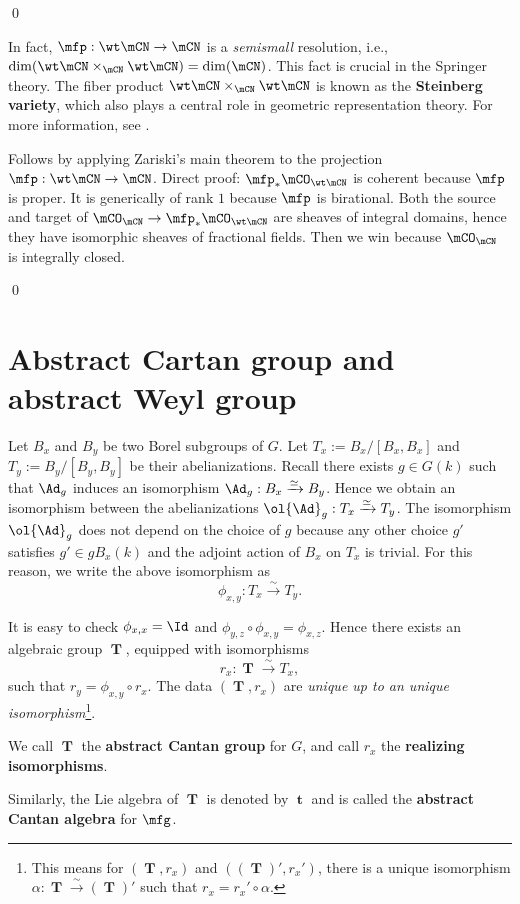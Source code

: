 	\qed

	\begin{rem}
		In fact, $\mfp:\wt\mCN \to \mCN$ is a \emph{semismall} resolution, i.e., $\dim(\wt\mCN\mt_\mCN\wt\mCN) = \dim(\mCN)$. This fact is crucial in the Springer theory. The fiber product $\wt\mCN\mt_\mCN\wt\mCN$ is known as the \textbf{Steinberg variety}, which also plays a central role in geometric representation theory. For more information, see \cite{CG}.
	\end{rem}


		Follows by applying Zariski's main theorem to the projection $\mfp: \wt\mCN \to \mCN$. Direct proof: $\mfp_* \mCO_{\wt\mCN}$ is coherent because $\mfp$ is proper. It is generically of rank $1$ because $\mfp$ is birational. Both the source and target of $\mCO_\mCN\to \mfp_* \mCO_{\wt\mCN}$ are sheaves of integral domains, hence they have isomorphic sheaves of fractional fields. Then we win because $\mCO_\mCN$ is integrally closed.

	\qed


	\appendix

	\section{Abstract Cartan group and abstract Weyl group}
	\label{app-abs}

	\begin{constr}
		Let $B_x$ and $B_y$ be two Borel subgroups of $G$. Let $T_x:=B_x/[B_x,B_x]$ and $T_y:=B_y/[B_y,B_y]$ be their abelianizations. Recall there exists $g\in G(k)$ such that $\Ad_g$ induces an isomorphism $\Ad_g: B_x \xrightarrow{\simeq} B_y$. Hence we obtain an isomorphism between the abelianizations $\ol{\Ad}_g: T_x \xrightarrow{\simeq} T_y$.
		The isomorphism $\ol{\Ad}_g$ does not depend on the choice of $g$ because any other choice $g'$ satisfies $g'\in g B_x(k)$ and the adjoint action of $B_x$ on $T_x$ is trivial. For this reason, we write the above isomorphism as
		\[
			\phi_{x,y}: T_x \xrightarrow{\sim} T_y.
		\]

		It is easy to check $\phi_{x,x}=\Id$ and $\phi_{y,z}\circ \phi_{x,y}=\phi_{x,z}$. Hence there exists an algebraic group $\mbfT$, equipped with isomorphisms
		\[
			r_x: \mbfT \xrightarrow{\sim} T_x,
		\]
		such that $r_y = \phi_{x,y}\circ r_x$. The data $(\mbfT, r_x)$ are \emph{unique up to an unique isomorphism}\footnote{This means for $(\mbfT, r_x)$ and $((\mbfT)', r_x')$, there is a unique isomorphism $\alpha:\mbfT \xrightarrow{\sim} (\mbfT)'$ such that $r_x= r_x'\circ \alpha$.}.

		We call $\mbfT$ the \textbf{abstract Cantan group} for $G$, and call $r_x$ the \textbf{realizing isomorphisms}.

		Similarly, the Lie algebra of $\mbfT$ is denoted by $\mbft$ and is called the \textbf{abstract Cantan algebra} for $\mfg$.
	\end{constr}

